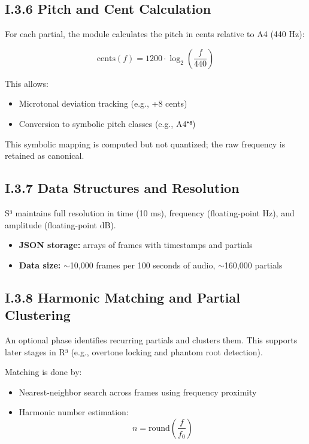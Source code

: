 \subsection*{I.3.6 Pitch and Cent Calculation}

For each partial, the module calculates the pitch in cents relative to A4 (440 Hz):

\[
\text{cents}(f) = 1200 \cdot \log_2 \left( \frac{f}{440} \right)
\]

This allows:

\begin{itemize}
    \item Microtonal deviation tracking (e.g., +8 cents)
    \item Conversion to symbolic pitch classes (e.g., A4⁺⁸)
\end{itemize}

This symbolic mapping is computed but not quantized; the raw frequency is retained as canonical.

\subsection*{I.3.7 Data Structures and Resolution}

S³ maintains full resolution in time (10 ms), frequency (floating-point Hz), and amplitude (floating-point dB).

\begin{itemize}
    \item \textbf{JSON storage:} arrays of frames with timestamps and partials
    \item \textbf{Data size:} $\sim$10,000 frames per 100 seconds of audio, $\sim$160,000 partials
\end{itemize}

\subsection*{I.3.8 Harmonic Matching and Partial Clustering}

An optional phase identifies recurring partials and clusters them. This supports later stages in R³ (e.g., overtone locking and phantom root detection).

Matching is done by:

\begin{itemize}
    \item Nearest-neighbor search across frames using frequency proximity
    \item Harmonic number estimation:
    \[
    n = \text{round} \left( \frac{f}{f_0} \right)
    \]
\end{itemize}

